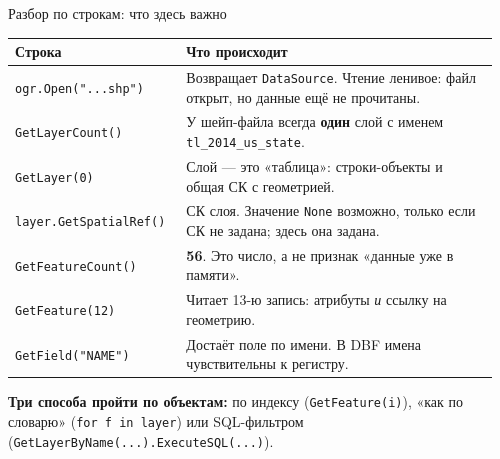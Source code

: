 \documentclass[aspectratio=169,10pt]{beamer}
\newcommand{\num}[1]{\textcolor{codered}{\textbf{#1}}}
\begin{document}
\begin{frame}{Разбор по строкам: что здесь важно}
\footnotesize
{}
\begin{tabular}{@{}p{0.34\linewidth}p{0.62\linewidth}@{}}
  \toprule
  Строка & Что происходит \\
  \midrule
  \texttt{ogr.Open("...shp")} &
    Возвращает \texttt{DataSource}. Чтение ленивое: файл открыт, но данные
    ещё не прочитаны. \\
  \texttt{GetLayerCount()} &
    У шейп-файла всегда \textbf{один} слой с именем
    \texttt{tl\_2014\_us\_state}. \\
  \texttt{GetLayer(0)} &
    Слой --- это «таблица»: строки-объекты и общая СК с геометрией. \\
  \texttt{layer.GetSpatialRef()} &
    СК слоя. Значение \texttt{None} возможно, только если СК не задана;
    здесь она задана. \\
  \texttt{GetFeatureCount()} &
    \num{56}. Это число, а не признак «данные уже в памяти». \\
  \texttt{GetFeature(12)} &
    Читает 13-ю запись: атрибуты \emph{и} ссылку на геометрию. \\
  \texttt{GetField("NAME")} &
    Достаёт поле по имени. В DBF имена чувствительны к регистру. \\
  \bottomrule
\end{tabular}
\vspace{0.5em}
{\scriptsize \textbf{Три способа пройти по объектам:} по индексу
(\texttt{GetFeature(i)}), «как по словарю» (\texttt{for f in layer})
или SQL-фильтром (\texttt{GetLayerByName(...).ExecuteSQL(...)}).}
\end{frame}
\end{document}
